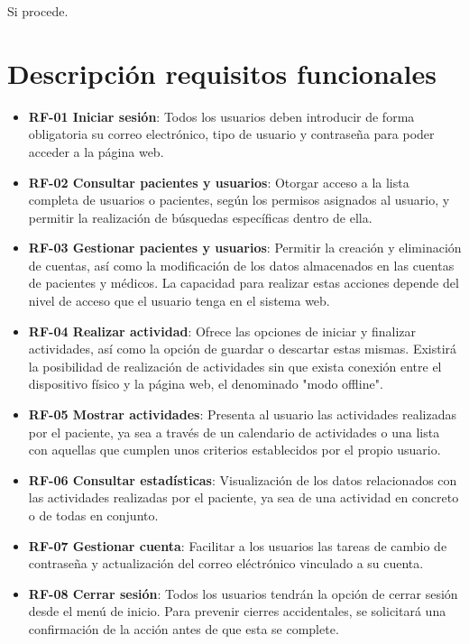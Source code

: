 
Si procede.

\section{Descripción requisitos funcionales}

\begin{itemize}
    \item \textbf{RF-01 Iniciar sesión}: Todos los usuarios deben introducir de forma obligatoria su correo electrónico, tipo de usuario y contraseña para poder acceder a la página web.
    \item \textbf{RF-02 Consultar pacientes y usuarios}: Otorgar acceso a la lista completa de usuarios o pacientes, según los permisos asignados al usuario, y permitir la realización de búsquedas específicas dentro de ella.
    \item \textbf{RF-03 Gestionar pacientes y usuarios}: Permitir la creación y eliminación de cuentas, así como la modificación de los datos almacenados en las cuentas de pacientes y médicos. La capacidad para realizar estas acciones depende del nivel de acceso que el usuario tenga en el sistema web.
    \item \textbf{RF-04 Realizar actividad}: Ofrece las opciones de iniciar y finalizar actividades, así como la opción de guardar o descartar estas mismas. Existirá la posibilidad de realización de actividades sin que exista conexión entre el dispositivo físico y la página web, el denominado "modo offline".
    \item \textbf{RF-05 Mostrar actividades}: Presenta al usuario las actividades realizadas por el paciente, ya sea a través de un calendario de actividades o una lista con aquellas que cumplen unos criterios establecidos por el propio usuario.
    \item \textbf{RF-06 Consultar estadísticas}: Visualización de los datos relacionados con las actividades realizadas por el paciente, ya sea de una actividad en concreto o de todas en conjunto.
    \item \textbf{RF-07 Gestionar cuenta}: Facilitar a los usuarios las tareas de cambio de contraseña y actualización del correo eléctrónico vinculado a su cuenta.
    \item \textbf{RF-08 Cerrar sesión}: Todos los usuarios tendrán la opción de cerrar sesión desde el menú de inicio. Para prevenir cierres accidentales, se solicitará una confirmación de la acción antes de que esta se complete.
\end{itemize}


